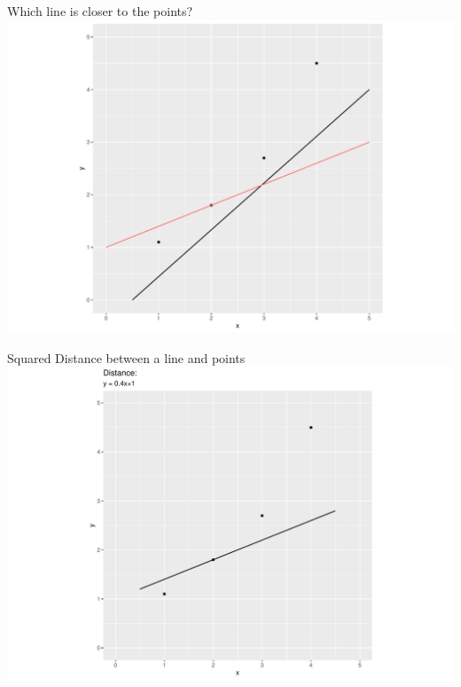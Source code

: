 \documentclass[
  ignorenonframetext,
]{beamer}
\begin{document}
\begin{frame}{Which line is closer to the points?}
\protect\hypertarget{which-line-is-closer-to-the-points}{}
\includegraphics{1_files/figure-beamer/unnamed-chunk-3-1.pdf}
\end{frame}

\begin{frame}{Squared Distance between a line and points}
\protect\hypertarget{squared-distance-between-a-line-and-points}{}
\includegraphics{1_files/figure-beamer/unnamed-chunk-4-1.pdf}
\end{frame}
\end{document}
